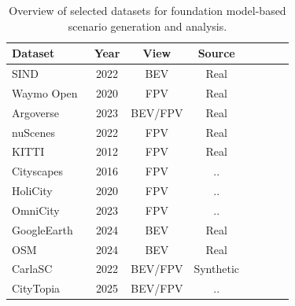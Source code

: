 \documentclass{article}
\begin{document}
\begin{table}[ht]
\centering
\caption{Overview of selected datasets for foundation model-based scenario generation and analysis.}
\label{tab:datasets}
\renewcommand{\arraystretch}{1.1}
\begin{tabular}{lccccccc}
\toprule
\textbf{Dataset} & \textbf{Year} & \textbf{View} & \textbf{Source} \\
\midrule
SIND~\cite{xu2022drone}             & 2022 & BEV        & Real         \\
Waymo Open~\cite{sun2020scalability}       & 2020 & FPV        & Real  \\
Argoverse~\cite{chang2019argoverse}\cite{wilson2023argoverse}        & 2023 & BEV/FPV    & Real \\
nuScenes~\cite{caesar2020nuscenes}      & 2022 & FPV        & Real \\
KITTI~\cite{geiger2012we}            & 2012 & FPV        & Real \\
Cityscapes~\cite{cordts2016cityscapes}      & 2016 & FPV        & .. \\
HoliCity~\cite{zhou2020holicity}          & 2020 & FPV        & .. \\
OmniCity~\cite{li2023omnicity}          & 2023 & FPV        & ..  \\
GoogleEarth~\cite{xie2024citydreamer}          & 2024 & BEV        & Real  \\
OSM~\cite{xie2024citydreamer}          & 2024 & BEV        & Real \\
CarlaSC~\cite{wilson2022motionsc}          & 2022 & BEV/FPV    & Synthetic \\
CityTopia~\cite{xie2025citydreamer4d}          & 2025 & BEV/FPV    & .. \\
\bottomrule
\end{tabular}
\end{table}





\end{document}
